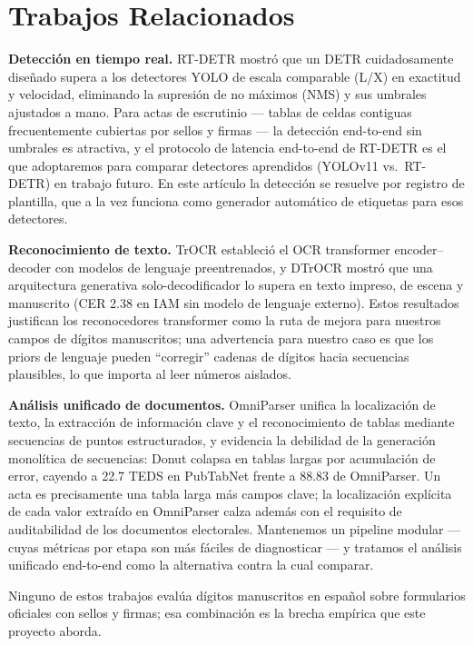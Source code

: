 \documentclass[conference]{IEEEtran}
\begin{document}
\section{Trabajos Relacionados}
\textbf{Detecci\'on en tiempo real.} RT-DETR \cite{rtdetr} mostr\'o que un
DETR cuidadosamente dise\~nado supera a los detectores YOLO de escala
comparable (L/X) en exactitud y velocidad, eliminando la supresi\'on de no
m\'aximos (NMS) y sus umbrales ajustados a mano. Para actas de escrutinio ---
tablas de celdas contiguas frecuentemente cubiertas por sellos y firmas ---
la detecci\'on end-to-end sin umbrales es atractiva, y el protocolo de
latencia end-to-end de RT-DETR es el que adoptaremos para comparar detectores
aprendidos (YOLOv11 vs.\ RT-DETR) en trabajo futuro. En este art\'iculo la
detecci\'on se resuelve por registro de plantilla, que a la vez funciona como
generador autom\'atico de etiquetas para esos detectores.

\textbf{Reconocimiento de texto.} TrOCR \cite{trocr} estableci\'o el OCR
transformer encoder--decoder con modelos de lenguaje preentrenados, y DTrOCR
\cite{dtrocr} mostr\'o que una arquitectura generativa solo-decodificador lo
supera en texto impreso, de escena y manuscrito (CER 2.38 en IAM sin modelo
de lenguaje externo). Estos resultados justifican los reconocedores
transformer como la ruta de mejora para nuestros campos de d\'igitos
manuscritos; una advertencia para nuestro caso es que los priors de lenguaje
pueden ``corregir'' cadenas de d\'igitos hacia secuencias plausibles, lo que
importa al leer n\'umeros aislados.

\textbf{An\'alisis unificado de documentos.} OmniParser \cite{omniparser}
unifica la localizaci\'on de texto, la extracci\'on de informaci\'on clave y
el reconocimiento de tablas mediante secuencias de puntos estructurados, y
evidencia la debilidad de la generaci\'on monol\'itica de secuencias: Donut
\cite{donut} colapsa en tablas largas por acumulaci\'on de error, cayendo a
22.7 TEDS en PubTabNet frente a 88.83 de OmniParser. Un acta es precisamente
una tabla larga m\'as campos clave; la localizaci\'on expl\'icita de cada
valor extra\'ido en OmniParser calza adem\'as con el requisito de
auditabilidad de los documentos electorales. Mantenemos un pipeline modular
--- cuyas m\'etricas por etapa son m\'as f\'aciles de diagnosticar --- y
tratamos el an\'alisis unificado end-to-end como la alternativa contra la
cual comparar.

Ninguno de estos trabajos eval\'ua d\'igitos manuscritos en espa\~nol sobre
formularios oficiales con sellos y firmas; esa combinaci\'on es la brecha
emp\'irica que este proyecto aborda.
\end{document}
